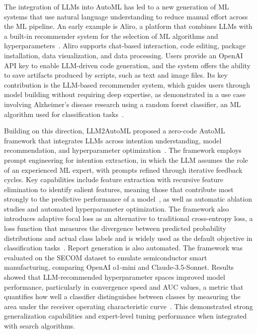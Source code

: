 \documentclass[
english,                 %
bibtex,                  %
]{kththesis}
\numberwithin{listing}{chapter}
\begin{document}
The integration of \glspl{LLM} into \gls{AutoML} has led to a new generation of \gls{ML} systems that use natural language understanding to reduce manual effort across the \gls{ML} pipeline. An early example is Aliro, a platform that combines \glspl{LLM} with a built-in recommender system for the selection of \gls{ML} algorithms and hyperparameters~\cite{choi_aliro_2023}. Aliro supports chat-based interaction, code editing, package installation, data visualization, and data processing. Users provide an \gls{OpenAI} \gls{API} key to enable \gls{LLM}-driven code generation, and the system offers the ability to save artifacts produced by scripts, such as text and image files. Its key contribution is the \gls{LLM}-based recommender system, which guides users through model building without requiring deep expertise, as demonstrated in a use case involving Alzheimer's disease research using a random forest classifier, an \gls{ML} algorithm used for classification tasks~\cite{breiman_random_2001}.

Building on this direction, \gls{LLM2AutoML} proposed a zero-code \gls{AutoML} framework that integrates \glspl{LLM} across intention understanding, model recommendation, and hyperparameter optimization~\cite{chen_llm2automl_2024}. The framework employs prompt engineering for intention extraction, in which the \gls{LLM} assumes the role of an experienced \gls{ML} expert, with prompts refined through iterative feedback cycles. Key capabilities include feature extraction with recursive feature elimination to identify salient features, meaning those that contribute most strongly to the predictive performance of a model~\cite{guyon_gene_2002, guyon_introduction_2003}, as well as automatic ablation studies and automated hyperparameter optimization. The framework also introduces adaptive focal loss as an alternative to traditional cross-entropy loss, a loss function that measures the divergence between predicted probability distributions and actual class labels and is widely used as the default objective in classification tasks~\cite{goodfellow_deep_2016}. Report generation is also automated. The framework was evaluated on the \gls{SECOM} dataset to emulate semiconductor smart manufacturing, comparing \gls{OpenAI} o1-mini and Claude-3.5-Sonnet. Results showed that \gls{LLM}-recommended hyperparameter spaces improved model performance, particularly in convergence speed and \gls{AUC} values, a metric that quantifies how well a classifier distinguishes between classes by measuring the area under the receiver operating characteristic curve~\cite{alzubaidi_review_2021}. This demonstrated strong generalization capabilities and expert-level tuning performance when integrated with search algorithms.
\end{document}
